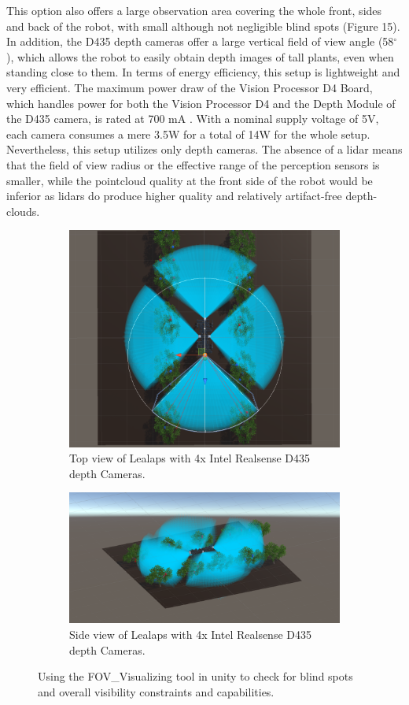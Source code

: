 \documentclass{article}
\begin{document}
\begin{enumerate}
This option also offers a large observation area covering the whole front, sides and back of the robot, with small although not negligible blind spots (Figure 15). In addition, the D435 depth cameras offer a large vertical field of view angle (58$^{\circ}$), which allows the robot to easily obtain depth images of tall plants, even when standing close to them. 
In terms of energy efficiency, this setup is lightweight and very efficient. The maximum power draw of the Vision Processor D4 Board, which handles power for both the Vision Processor D4 and the Depth Module of the D435 camera, is rated at 700 mA \cite{noauthor_amp_nodate}. With a nominal supply voltage of 5V, each camera consumes a mere 3.5W for a total of 14W for the whole setup. 
Nevertheless, this setup utilizes only depth cameras. The absence of a lidar means that the field of view radius or the effective range of the perception sensors is smaller, while the pointcloud quality at the front side of the robot would be inferior as lidars do produce higher quality and relatively artifact-free depth-clouds.

\begin{figure}
\centering
\begin{subfigure}[htbp]{1\textwidth}
   \centering
   \includegraphics[width=0.8\linewidth]{FOV(21).png}
   \caption{Top view of Lealaps with 4x Intel Realsense D435 depth Cameras.}
\end{subfigure}
\begin{subfigure}[htbp]{1\textwidth}
   \centering
   \includegraphics[width=0.8\linewidth]{FOV(22).png}
   \caption{Side view of Lealaps with 4x Intel Realsense D435 depth Cameras.}
\end{subfigure}
\caption[]{Using the FOV\_Visualizing tool in unity to check for blind spots and overall visibility constraints and capabilities.}
\end{figure}


\end{enumerate}
\end{document}
